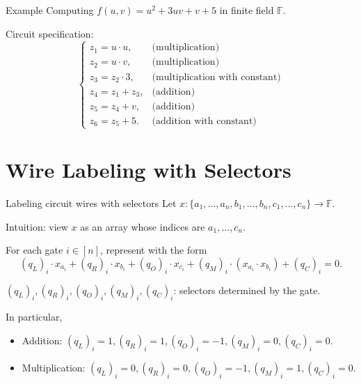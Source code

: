 \documentclass{beamer}
\begin{document}
	\begin{frame}{Example}
		Computing $f(u, v) = u^2 + 3uv + v + 5$ in finite field $\mathbb{F}$. 
		
		 Circuit specification:
		 \begin{equation*}
		 	\begin{cases}
		 		z_1 = u \cdot u,&\text{(multiplication)}\\
		 		z_2 = u \cdot v,&\text{(multiplication)}\\
		 		z_3 = z_2 \cdot 3,&\text{(multiplication with constant)}\\
		 		z_4 = z_1 + z_3,&\text{(addition)}\\
		 		z_5 = z_4 + v,&\text{(addition)}\\
		 		z_6 = z_5 + 5.&\text{(addition with constant)}
		 	\end{cases}
		 \end{equation*}
	\end{frame}

	\section{Wire Labeling with Selectors}
	\begin{frame}{Labeling circuit wires with selectors}
		Let $x : \{a_1, \dots, a_n, b_1, \dots, b_n, c_1, \dots, c_n\} \rightarrow \mathbb{F}$.
		
		Intuition: view $x$ as an array whose indices are $a_1, \dots, c_n$.
		
		For each gate $i \in [n]$, represent with the form
		\begin{equation*}
			(q_L)_i \cdot x_{a_i} + (q_R)_i \cdot x_{b_i} + (q_O)_i \cdot x_{c_i} + (q_M)_i \cdot (x_{a_i} \cdot x_{b_i}) + (q_C)_i = 0.
		\end{equation*}
		
		$(q_L)_i, (q_R)_i, (q_O)_i, (q_M)_i, (q_C)_i$: selectors determined by the gate.
		
		In particular,
		\begin{itemize}
			\item Addition: $(q_L)_i = 1, (q_R)_i = 1, (q_O)_i = -1, (q_M)_i = 0, (q_C)_i = 0$.
			\item Multiplication: $(q_L)_i = 0, (q_R)_i = 0, (q_O)_i = -1, (q_M)_i = 1, (q_C)_i = 0$.
		\end{itemize}
	\end{frame}
\end{document}
